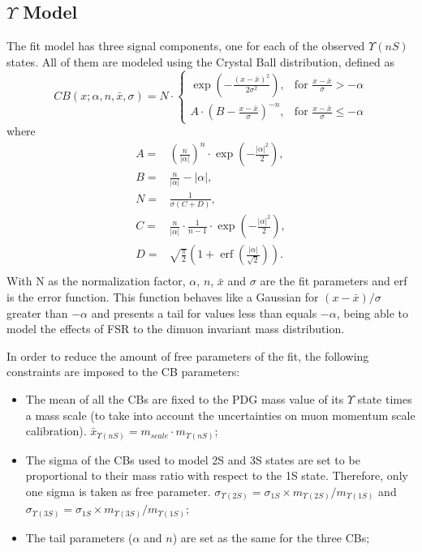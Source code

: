 \subsection{\texorpdfstring{$\Upsilon$}{Y} Model}

The fit model has three signal components, one for each of the observed $\Upsilon(nS)$ states. All of them are modeled using the Crystal Ball distribution, defined as
\begin{equation}
  CB(x;\alpha,n,\bar x,\sigma) = N \cdot
  \begin{cases}
    \exp(- \frac{(x - \bar x)^2}{2 \sigma^2}),    & \mbox{for }\frac{x - \bar x}{\sigma} > -\alpha         \\
    A \cdot (B - \frac{x - \bar x}{\sigma})^{-n}, & \mbox{for }\frac{x - \bar x}{\sigma} \leqslant -\alpha
  \end{cases}
\end{equation}
where
\begin{equation}
  \begin{split}
    A = & \left(\frac{n}{\left| \alpha \right|}\right)^n \cdot \exp\left(- \frac {\left| \alpha \right|^2}{2}\right), \\
    B = & \frac{n}{\left| \alpha \right|}  - \left| \alpha \right|, \\
    N = & \frac{1}{\sigma (C + D)}, \\
    C = & \frac{n}{\left| \alpha \right|} \cdot \frac{1}{n-1} \cdot \exp\left(- \frac {\left| \alpha \right|^2}{2}\right), \\
    D = & \sqrt{\frac{\pi}{2}} \left(1 + \operatorname{erf}\left(\frac{\left| \alpha \right|}{\sqrt 2}\right)\right). \\
  \end{split}
\end{equation}
With N as the normalization factor, $\alpha$, $n$, $\bar x$ and $\sigma$ are the fit parameters and erf is the error function. This function behaves like a Gaussian for $(x-\bar x)/\sigma$ greater than $-\alpha$ and presents a tail for values less than equals $-\alpha$, being able to model the effects of FSR to the dimuon invariant mass distribution.

In order to reduce the amount of free parameters of the fit, the following constraints are imposed to the CB parameters:
\begin{itemize}
  \item The mean of all the CBs are fixed to the PDG mass value of its $\Upsilon$ state times a mass scale (to take into account the uncertainties on muon momentum scale calibration). $\bar x_{\Upsilon(nS)} = m_{scale}\cdot m_{\Upsilon(nS)}$;
  \item The sigma of the CBs used to model 2S and 3S states are set to be proportional to their mass ratio with respect to the 1S state. Therefore, only one sigma is taken as free parameter. $\sigma_{\Upsilon(2S)} = \sigma_{1S}\times m_{\Upsilon(2S)}/m_{\Upsilon(1S)}$ and $\sigma_{\Upsilon(3S)} = \sigma_{1S}\times m_{\Upsilon(3S)}/m_{\Upsilon(1S)}$;
  \item The tail parameters ($\alpha$ and $n$) are set as the same for the three CBs;
\end{itemize}


